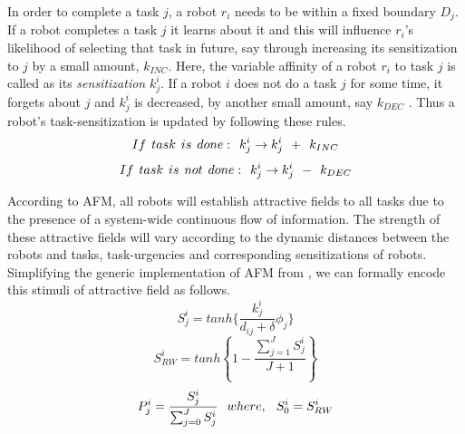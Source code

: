 \documentclass[final,5p,times,twocolumn]{elsarticle}
\begin{document}
In order to complete a task $j$, a robot $r_i$ needs to be within a fixed boundary $D_{j}$. If a robot completes a task $j$ it learns about it and this will influence $r_i$'s likelihood of selecting that task in future, say through increasing  its sensitization to $j$ by a small amount, $k_{INC}$. Here, the variable affinity of a robot $r_i$ to task $j$ is called as its {\em sensitization} $k^{i}_{j}$. If a robot $i$ does not do a task $j$ for some time, it forgets about $j$ and $k^i_j$ is decreased, by another small amount, say $k_{DEC}$ .
Thus a robot's task-sensitization is updated by following these rules.
\begin{equation}
 If\hspace*{0.15cm}task\hspace*{0.15cm}is\hspace*{0.15cm}done:\hspace*{0.15cm}  k^i_j \rightarrow   k^i_j \hspace*{0.15cm} + \hspace*{0.15cm} k_{INC}
\label{eqn:k-inc}
\end{equation}
\begin{equation}
 If\hspace*{0.15cm}task\hspace*{0.15cm}is\hspace*{0.15cm}not\hspace*{0.15cm}done:\hspace*{0.15cm}  k^i_j \rightarrow   k^i_j \hspace*{0.15cm} - \hspace*{0.15cm} k_{DEC}
\label{eqn:k-dec}
\end{equation}

According to AFM, all robots will establish attractive fields to all tasks due to the presence of a system-wide continuous flow of information. The strength of these attractive fields will vary according to the dynamic distances between the robots and tasks, task-urgencies and corresponding sensitizations of robots. Simplifying the generic implementation of AFM from \citet{Arcaute+2008}, we can formally encode this stimuli of attractive field as follows.
\begin{equation}
S_{j}^{i} = tanh\{\frac{k_{j}^{i}}{d_{ij}+\delta } \phi _{j}\}
\label{eqn:afm1}
\end{equation}
\begin{equation}
S^{i}_{RW} = tanh \left \{ 1 -  \frac{ \sum_{j=1}^{J} S^{i}_{j}}{J + 1} \right \}
\label{eqn:afm2}
\end{equation}
\begin{equation}
P_{j}^{i} = \frac{S_{j}^{i}}{\sum_{j=0}^{J} S_{j}^{i}} \hspace*{0.25cm}where,\hspace*{0.25cm}S^{i}_{0} = S^{i}_{RW}   
\label{eqn:afm3}
\end{equation}
\end{document}
